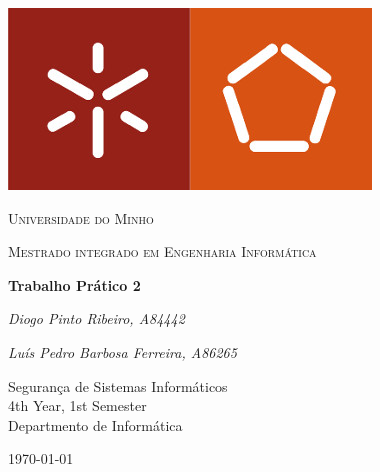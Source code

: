 \documentclass[12pt]{article}
\begin{document}
\thispagestyle{empty}
\setlength\headheight{0pt} 
\begin{center}

\begin{center}
\includegraphics[width=0.45\linewidth]{img/um_logo.jpg}            
\end{center}	

        \vspace{0.25cm}
        {\scshape\LARGE Universidade do Minho \par}
        \vspace{0.25cm}
        {\scshape\Large Mestrado integrado em Engenharia Informática\par}
        \vspace{0.5cm}

        {\Large\bfseries Trabalho Prático 2\par}
        
        \vspace{0.5cm}
        {\Large\itshape Diogo Pinto Ribeiro, A84442\par}
        {\Large\itshape Luís Pedro Barbosa Ferreira, A86265\par}
        \vspace{0.25cm}

\vspace{1cm}
Segurança de Sistemas Informáticos \\
4th Year, 1st Semester \\
Departmento de Informática\par
\vspace{1.5cm}
\large
\today

\end{center}

\clearpage
\restoregeometry
\justify

%
%
%

\renewcommand{\contentsname}{Contents}
\tableofcontents
\pagebreak

 









\printbibliography
\end{document}

